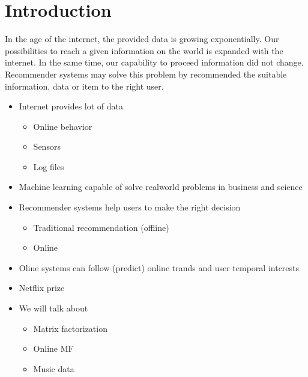 \chapter{Introduction}

In the age of the internet, the provided data is growing exponentially. Our possibilities
to reach a given information on the world  is expanded with the internet. In the same
time, our capability to proceed information did not change. Recommender systems may solve
this problem by recommended the suitable information, data or item  to the right user.


\begin{itemize}  
\item Internet provides lot of data 
  \begin{itemize}
  \item Online behavior
  \item Sensors
  \item Log files 
  \end{itemize}
\item Machine learning capable of solve realworld problems in business and
  science
\item Recommender systems help users to make the right decision
  \begin{itemize}
  \item Traditional recommendation (offline)
  \item Online 
  \end{itemize}
\item Oline systems can follow (predict) online trands and user temporal
  interests
\item Netflix prize
\item We will talk about
  \begin{itemize}
  \item Matrix factorization
  \item Online MF
  \item Music data 
  \end{itemize}
\end{itemize}
